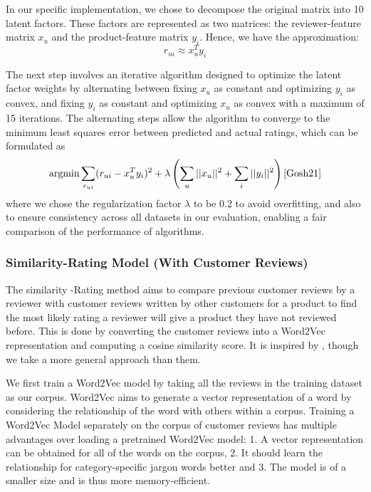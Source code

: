 \documentclass[sigconf,authorversion,nonacm]{acmart}
\begin{document}
    In our specific implementation, we chose to decompose the original matrix into 10 latent factors. These factors are represented as two matrices: the reviewer-feature matrix $x_{u}$ and the product-feature matrix $y_{i}$. Hence, we have the approximation:
    $$r_{ui} \approx x_u^T y_i$$
    
    The next step involves an iterative algorithm designed to optimize the latent factor weights by alternating between fixing $x_u$ as constant and optimizing $y_i$ as convex, and fixing $y_i$ as constant and optimizing $x_u$ as convex with a maximum of 15 iterations. The alternating steps allow the algorithm to converge to the minimum least squares error between predicted and actual ratings, which can be formulated as
    $${\operatorname{argmin}} \sum_{r_{ui}} (r_{ui} - x_u^T y_i)^2 + \lambda \left(\sum_u ||x_u||^2 + \sum_i ||y_i||^2 \right)\cite{Gosh21}$$ where we chose the regularization factor $\lambda$ to be 0.2 to avoid overfitting, and also to ensure consistency across all datasets in our evaluation, enabling a fair comparison of the performance of algorithms. 
    
\subsubsection{Similarity-Rating Model (With Customer Reviews)}

The similarity -Rating method aims to compare previous customer reviews by a reviewer with customer reviews written by other customers for a product to find the most likely rating a reviewer will give a product they have not reviewed before. This is done by converting the customer reviews into a Word2Vec representation and computing a cosine similarity score. It is inspired by \cite{hasanzadeh2022based}, though we take a more general approach than them. 

We first train a Word2Vec model by taking all the reviews in the training dataset as our corpus. Word2Vec aims to generate a vector representation of a word by considering the relationship of the word with others within a corpus. Training a Word2Vec Model separately on the corpus of customer reviews has multiple advantages over loading a pretrained Word2Vec model: 1. A vector representation can be obtained for all of the words on the corpus, 2. It should learn the relationship for category-specific jargon words better and 3. The model is of a smaller size and is thus more memory-efficient. 
\end{document}

